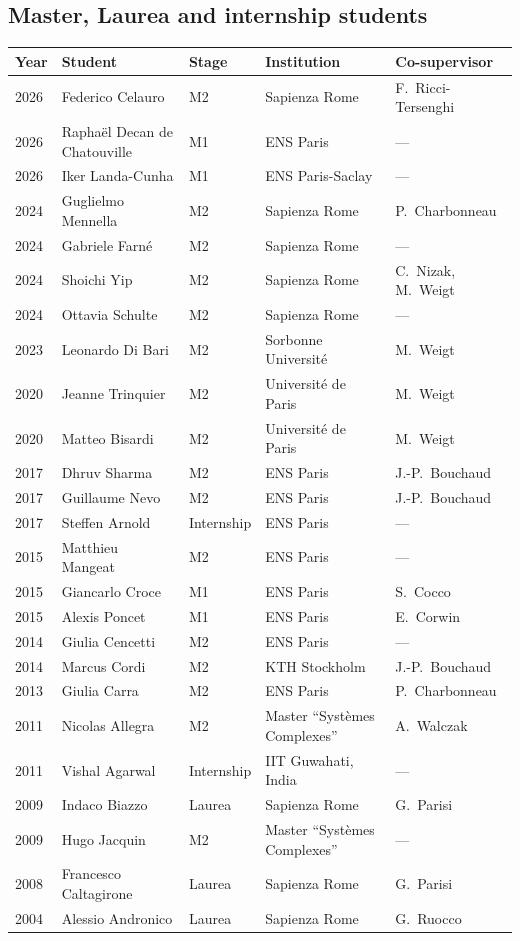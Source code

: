\documentclass[a4paper,10pt]{article}
\begin{document}
\subsection{Master, Laurea and internship students}
\vspace{4pt}
{\small
\begin{tabularx}{\textwidth}{@{}>{\hspace{0pt}\color{datecol}}p{} p{} p{} >{\raggedright\arraybackslash}X p{}@{}}
\textbf{Year} & \textbf{Student} & \textbf{Stage} & \textbf{Institution} & \textbf{Co-supervisor} \\[1pt]
\hline
2026 & Federico Celauro & M2 & Sapienza Rome & F.~Ricci-Tersenghi \\
2026 & Rapha\"el Decan de Chatouville & M1 & ENS Paris & --- \\
2026 & Iker Landa-Cunha & M1 & ENS Paris-Saclay & --- \\
2024 & Guglielmo Mennella & M2 & Sapienza Rome & P.~Charbonneau \\
2024 & Gabriele Farn\'e & M2 & Sapienza Rome & --- \\
2024 & Shoichi Yip & M2 & Sapienza Rome & C.~Nizak, M.~Weigt \\
2024 & Ottavia Schulte & M2 & Sapienza Rome & --- \\
2023 & Leonardo Di Bari & M2 & Sorbonne Universit\'e & M.~Weigt \\
2020 & Jeanne Trinquier & M2 & Universit\'e de Paris & M.~Weigt \\
2020 & Matteo Bisardi & M2 & Universit\'e de Paris & M.~Weigt \\
2017 & Dhruv Sharma & M2 & ENS Paris & J.-P.~Bouchaud \\
2017 & Guillaume Nevo & M2 & ENS Paris & J.-P.~Bouchaud \\
2017 & Steffen Arnold & Internship & ENS Paris & --- \\
2015 & Matthieu Mangeat & M2 & ENS Paris & --- \\
2015 & Giancarlo Croce & M1 & ENS Paris & S.~Cocco \\
2015 & Alexis Poncet & M1 & ENS Paris & E.~Corwin \\
2014 & Giulia Cencetti & M2 & ENS Paris & --- \\
2014 & Marcus Cordi & M2 & KTH Stockholm & J.-P.~Bouchaud \\
2013 & Giulia Carra & M2 & ENS Paris & P.~Charbonneau \\
2011 & Nicolas Allegra & M2 & Master ``Syst\`emes Complexes'' & A.~Walczak \\
2011 & Vishal Agarwal & Internship & IIT Guwahati, India & --- \\
2009 & Indaco Biazzo & Laurea & Sapienza Rome & G.~Parisi \\
2009 & Hugo Jacquin & M2 & Master ``Syst\`emes Complexes'' & --- \\
2008 & Francesco Caltagirone & Laurea & Sapienza Rome & G.~Parisi \\
2004 & Alessio Andronico & Laurea & Sapienza Rome & G.~Ruocco \\
\hline
\end{tabularx}}
\end{document}

